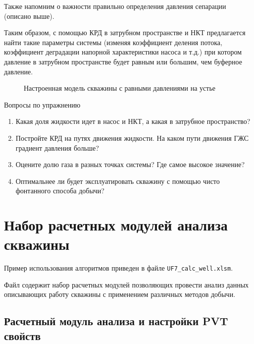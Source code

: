 Также напомним о важности правильно определения давления сепарации (описано выше). 

Таким образом, с помощью КРД в затрубном пространстве и НКТ предлагается найти такие параметры системы (изменяя коэффициент деления потока, коэффициент деградации напорной характеристики насоса и т.д.) при котором давление в затрубном пространстве будет равным или большим, чем буферное давление.

\begin{figure}[h!]
	\center{\texttt{[image: Ex110\_2]}}
	\caption{Настроенная модель скважины с равными давлениями на устье}
	\label{ris:Ex110_2}
\end{figure}

Вопросы по упражнению
\begin{enumerate}
	\item  Какая доля жидкости идет в насос и НКТ, а какая в затрубное пространство?
	\item  Постройте КРД на путях движения жидкости. На каком пути движения ГЖС градиент давления больше?
	\item Оцените долю газа в разных точках системы? Где самое высокое значение?
	\item Оптимальнее ли будет эксплуатировать скважину с помощью чисто фонтанного способа добычи?
\end{enumerate}


\section{Набор расчетных модулей анализа скважины}
Пример использования алгоритмов \unf   приведен в файле \texttt{UF7\_calc\_well.xlsm}.

Файл содержит набор расчетных модулей позволяющих провести анализ данных описывающих работу скважины с применением различных методов добычи.

\subsection{Расчетный модуль анализа и настройки PVT свойств}

